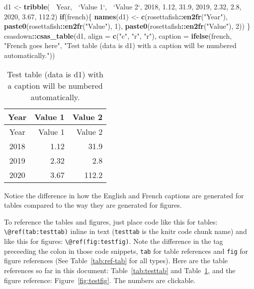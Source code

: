 \documentclass[12pt]{article}\usepackage[]{graphicx}\usepackage[]{color}
\newenvironment{Shaded}{}{}
\newcommand{\KeywordTok}[1]{\textcolor[rgb]{0.00,0.44,0.13}{\textbf{{#1}}}}
\newcommand{\DataTypeTok}[1]{\textcolor[rgb]{0.56,0.13,0.00}{{#1}}}
\newcommand{\DecValTok}[1]{\textcolor[rgb]{0.25,0.63,0.44}{{#1}}}
\newcommand{\FloatTok}[1]{\textcolor[rgb]{0.25,0.63,0.44}{{#1}}}
\newcommand{\StringTok}[1]{\textcolor[rgb]{0.25,0.44,0.63}{{#1}}}
\newcommand{\NormalTok}[1]{{#1}}
\newcommand{\OperatorTok}[1]{\textcolor[rgb]{0.00,0.44,0.13}{\textbf{{#1}}}}
\newcommand{\ControlFlowTok}[1]{\textcolor[rgb]{0.00,0.44,0.13}{\textbf{{#1}}}}
\begin{document}
\begin{Shaded}
\begin{Highlighting}[]
\NormalTok{d1 <-}\StringTok{ }\KeywordTok{tribble}\NormalTok{(}
  \OperatorTok{~}\NormalTok{Year, }\OperatorTok{~}\StringTok{`}\DataTypeTok{Value 1}\StringTok{`}\NormalTok{, }\OperatorTok{~}\StringTok{`}\DataTypeTok{Value 2}\StringTok{`}\NormalTok{,}
   \DecValTok{2018}\NormalTok{,       }\FloatTok{1.12}\NormalTok{,       }\FloatTok{31.9}\NormalTok{,}
   \DecValTok{2019}\NormalTok{,       }\FloatTok{2.32}\NormalTok{,        }\FloatTok{2.8}\NormalTok{,}
   \DecValTok{2020}\NormalTok{,       }\FloatTok{3.67}\NormalTok{,      }\FloatTok{112.2}\NormalTok{)}
\ControlFlowTok{if}\NormalTok{(french)\{}
  \KeywordTok{names}\NormalTok{(d1) <-}\StringTok{ }\KeywordTok{c}\NormalTok{(rosettafish}\OperatorTok{::}\KeywordTok{en2fr}\NormalTok{(}\StringTok{"Year"}\NormalTok{),}
                 \KeywordTok{paste0}\NormalTok{(rosettafish}\OperatorTok{::}\KeywordTok{en2fr}\NormalTok{(}\StringTok{"Value"}\NormalTok{), }\DecValTok{1}\NormalTok{),}
                 \KeywordTok{paste0}\NormalTok{(rosettafish}\OperatorTok{::}\KeywordTok{en2fr}\NormalTok{(}\StringTok{"Value"}\NormalTok{), }\DecValTok{2}\NormalTok{))}
\NormalTok{\}}
\NormalTok{csasdown}\OperatorTok{::}\KeywordTok{csas_table}\NormalTok{(d1,}
  \DataTypeTok{align =} \KeywordTok{c}\NormalTok{(}\StringTok{"c"}\NormalTok{, }\StringTok{"r"}\NormalTok{, }\StringTok{"r"}\NormalTok{),}
  \DataTypeTok{caption =} \KeywordTok{ifelse}\NormalTok{(french,}
                   \StringTok{"French goes here"}\NormalTok{,}
                   \StringTok{"Test table (data is d1) with a caption will be numbered automatically."}\NormalTok{))}
\end{Highlighting}
\end{Shaded}
\begin{longtable}[]{@{}crr@{}}
\caption{\label{tab:testtab2}Test table (data is d1) with a caption will be numbered automatically.}\tabularnewline
\toprule
Year & Value 1 & Value 2\tabularnewline
\midrule
\endfirsthead
\toprule
Year & Value 1 & Value 2\tabularnewline
\midrule
\endhead
2018 & 1.12 & 31.9\tabularnewline
2019 & 2.32 & 2.8\tabularnewline
2020 & 3.67 & 112.2\tabularnewline
\bottomrule
\end{longtable}
Notice the difference in how the English and French captions are generated for tables compared to the way they are generated for figures.

To reference the tables and figures, just place code like this for tables: \texttt{\textbackslash{}@ref(tab:testtab)} inline in text (\texttt{testtab} is the knitr code chunk name) and like this for figures: \texttt{\textbackslash{}@ref(fig:testfig)}. Note the difference in the tag preceeding the colon in those code snippets, \texttt{tab} for table references and \texttt{fig} for figure references (See Table~\ref{tab:ref-tab} for all types). Here are the table references so far in this document: Table~\ref{tab:testtab} and Table~\ref{tab:testtab2}, and the figure reference: Figure~\ref{fig:testfig}. The numbers are clickable.
\end{document}
